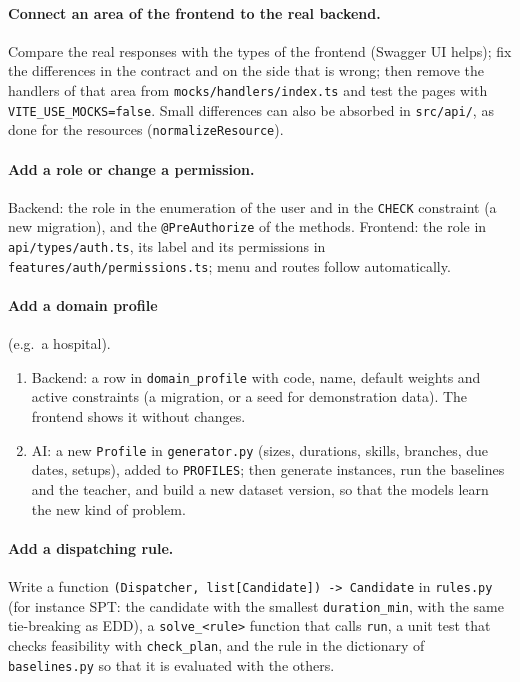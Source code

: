 \paragraph{Connect an area of the frontend to the real backend.} Compare the real responses with
the types of the frontend (Swagger UI helps); fix the differences in the contract and on the side
that is wrong; then remove the handlers of that area from \texttt{mocks/handlers/index.ts} and
test the pages with \texttt{VITE\_USE\_MOCKS=false}. Small differences can also be absorbed in
\texttt{src/api/}, as done for the resources (\texttt{normalizeResource}).

\paragraph{Add a role or change a permission.} Backend: the role in the enumeration of the user
and in the \texttt{CHECK} constraint (a new migration), and the \texttt{@PreAuthorize} of the
methods. Frontend: the role in \texttt{api/types/auth.ts}, its label and its permissions in
\texttt{features/auth/permissions.ts}; menu and routes follow automatically.

\paragraph{Add a domain profile} (e.g.\ a hospital).
\begin{enumerate}
  \item Backend: a row in \texttt{domain\_profile} with code, name, default weights and active
        constraints (a migration, or a seed for demonstration data). The frontend shows it
        without changes.
  \item AI: a new \texttt{Profile} in \texttt{generator.py} (sizes, durations, skills, branches,
        due dates, setups), added to \texttt{PROFILES}; then generate instances, run the
        baselines and the teacher, and build a new dataset version, so that the models learn the
        new kind of problem.
\end{enumerate}

\paragraph{Add a dispatching rule.} Write a function \texttt{(Dispatcher, list[Candidate]) ->
Candidate} in \texttt{rules.py} (for instance SPT: the candidate with the smallest
\texttt{duration\_min}, with the same tie-breaking as EDD), a \texttt{solve\_<rule>} function that
calls \texttt{run}, a unit test that checks feasibility with \texttt{check\_plan}, and the rule in
the dictionary of \texttt{baselines.py} so that it is evaluated with the others.


